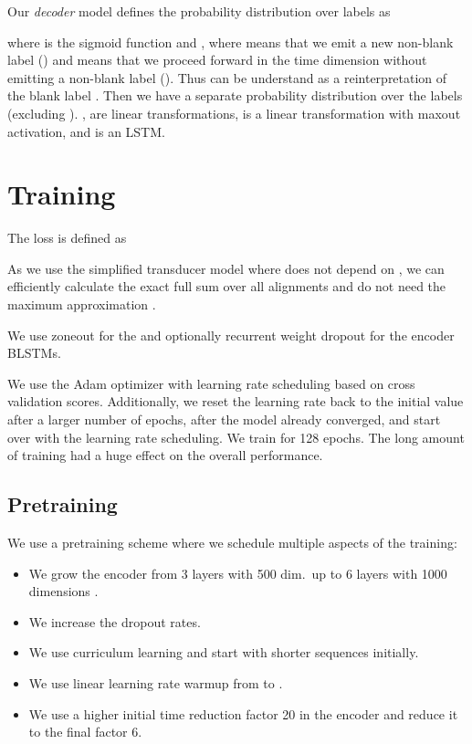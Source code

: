 \documentclass[a4paper]{article}
\begin{document}
Our \emph{decoder} model defines the probability distribution
over labels  as

where  is the sigmoid function
and ,
where  means that we emit a new non-blank label ()
and  means that we proceed forward in the time dimension
without emitting a non-blank label ().
Thus  can be understand as a reinterpretation of the blank label .
Then we have a separate probability distribution 
over the labels  (excluding ).
, 
are linear transformations,
 is a linear transformation with maxout activation,
and  is an LSTM.


\section{Training}

The loss is defined as

As we use the simplified transducer model
where  does not depend on ,
we can efficiently calculate the exact full sum over all alignments 
and do not need the maximum approximation \cite{zeyer2020:transducer}.

We use zoneout \cite{krueger2017zoneout} for the 
and optionally recurrent weight dropout \cite{wan13dropconnect} for the encoder BLSTMs.

We use the Adam optimizer \cite{kingma2015adam}
with learning rate scheduling based on cross validation scores.
Additionally, we reset the learning rate back to the initial value after a larger number of epochs,
after the model already converged,
and start over with the learning rate scheduling.
We train for 128 epochs. The long amount of training had a huge effect on the overall performance.

\subsection{Pretraining}

We use a pretraining scheme
where we schedule multiple aspects of the training:
\begin{itemize}
\item We grow the encoder from 3 layers with 500 dim.~up to 6 layers with 1000 dimensions \cite{zeyer2018:attanalysis}.
\item We increase the dropout rates.
\item
We use curriculum learning and start with shorter sequences initially.
\item We use linear learning rate warmup from  to .
\item We use a higher initial time reduction factor 20 in the encoder
and reduce it to the final factor 6.
\end{itemize}
\end{document}

